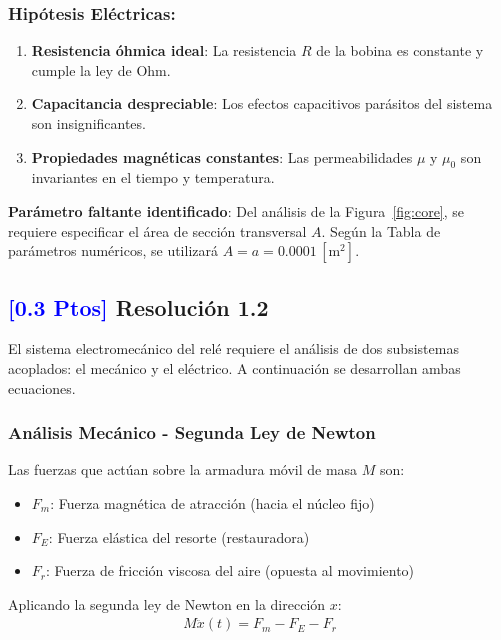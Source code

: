 \documentclass[
  11pt,
  letterpaper,
   addpoints,
   answers
  ]{exam}
\begin{document}
\begin{solution}
    \subsubsection*{Hipótesis Eléctricas:}
    \begin{enumerate}
      \item \textbf{Resistencia óhmica ideal}: La resistencia $R$ de la bobina es constante y cumple la ley de Ohm.
      \item \textbf{Capacitancia despreciable}: Los efectos capacitivos parásitos del sistema son insignificantes.
      \item \textbf{Propiedades magnéticas constantes}: Las permeabilidades $\mu$ y $\mu_0$ son invariantes en el tiempo y temperatura.
    \end{enumerate}

    \textbf{Parámetro faltante identificado}: Del análisis de la Figura~\ref{fig:core}, se requiere especificar el área de sección transversal $A$. Según la Tabla de parámetros numéricos, se utilizará $A = a = 0.0001\,[\mathrm{m}^2]$.
    \subsection*{\textcolor{blue}{[0.3 Ptos]} Resolución 1.2}
    
    El sistema electromecánico del relé requiere el análisis de dos subsistemas acoplados: el mecánico y el eléctrico. A continuación se desarrollan ambas ecuaciones.

    \subsubsection*{Análisis Mecánico - Segunda Ley de Newton}
    
    Las fuerzas que actúan sobre la armadura móvil de masa $M$ son:
    \begin{itemize}
        \item $F_m$: Fuerza magnética de atracción (hacia el núcleo fijo)
        \item $F_E$: Fuerza elástica del resorte (restauradora)
        \item $F_r$: Fuerza de fricción viscosa del aire (opuesta al movimiento)
    \end{itemize}

    Aplicando la segunda ley de Newton en la dirección $x$:
    \begin{align}
        M \ddot{x}(t) = F_m - F_E - F_r
    \end{align}


\end{solution}
\end{document}
